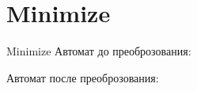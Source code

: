 \section{Minimize}
\begin{frame}{Minimize}
	Автомат до преоброзования:


	Автомат после преоброзования:


\end{frame}
